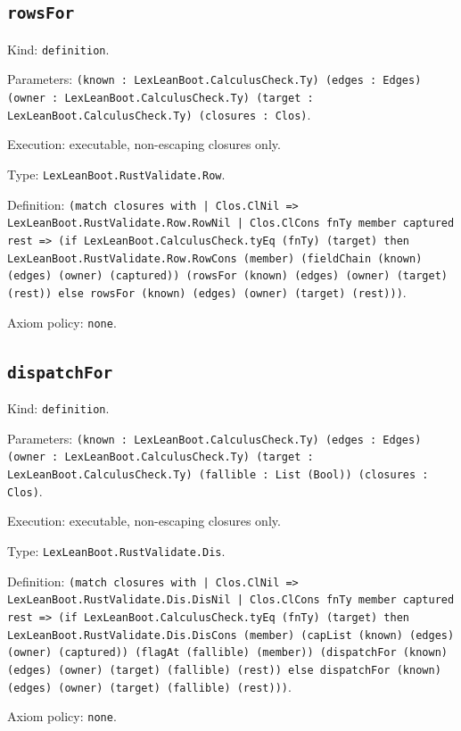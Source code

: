 \documentclass[11pt]{article}
\begin{document}
\subsection*{\texttt{rowsFor}}
\noindent Kind: \texttt{definition}.\par
\noindent Parameters: \texttt{(known : LexLeanBoot.CalculusCheck.Ty) (edges : Edges) (owner : LexLeanBoot.CalculusCheck.Ty) (target : LexLeanBoot.CalculusCheck.Ty) (closures : Clos)}.\par
\noindent Execution: executable, non-escaping closures only.\par
\noindent Type: \texttt{LexLeanBoot.RustValidate.Row}.\par
\noindent Definition: \texttt{(match closures with | Clos.ClNil => LexLeanBoot.RustValidate.Row.RowNil | Clos.ClCons fnTy member captured rest => (if LexLeanBoot.CalculusCheck.tyEq (fnTy) (target) then LexLeanBoot.RustValidate.Row.RowCons (member) (fieldChain (known) (edges) (owner) (captured)) (rowsFor (known) (edges) (owner) (target) (rest)) else rowsFor (known) (edges) (owner) (target) (rest)))}.\par
\noindent Axiom policy: \texttt{none}.\par
\subsection*{\texttt{dispatchFor}}
\noindent Kind: \texttt{definition}.\par
\noindent Parameters: \texttt{(known : LexLeanBoot.CalculusCheck.Ty) (edges : Edges) (owner : LexLeanBoot.CalculusCheck.Ty) (target : LexLeanBoot.CalculusCheck.Ty) (fallible : List (Bool)) (closures : Clos)}.\par
\noindent Execution: executable, non-escaping closures only.\par
\noindent Type: \texttt{LexLeanBoot.RustValidate.Dis}.\par
\noindent Definition: \texttt{(match closures with | Clos.ClNil => LexLeanBoot.RustValidate.Dis.DisNil | Clos.ClCons fnTy member captured rest => (if LexLeanBoot.CalculusCheck.tyEq (fnTy) (target) then LexLeanBoot.RustValidate.Dis.DisCons (member) (capList (known) (edges) (owner) (captured)) (flagAt (fallible) (member)) (dispatchFor (known) (edges) (owner) (target) (fallible) (rest)) else dispatchFor (known) (edges) (owner) (target) (fallible) (rest)))}.\par
\noindent Axiom policy: \texttt{none}.\par
\end{document}
